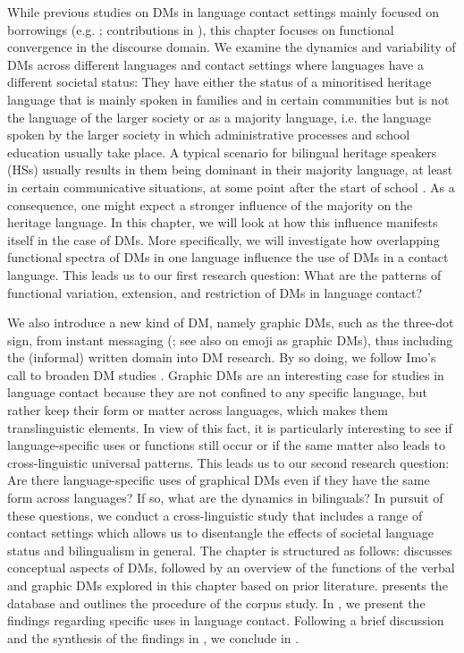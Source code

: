 \documentclass[output=paper,colorlinks,citecolor=brown]{langscibook}
\begin{document}
\noindent While previous studies on DMs in language contact settings mainly focused on borrowings (e.g. \citealt{salmons_bilingual_1990}; contributions in \citealt{maschler_discourse_2000}), this chapter focuses on functional convergence in the discourse domain. We examine the dynamics and variability of DMs across different languages and contact settings where languages have a different societal status: They have either the status of a minoritised heritage language that is mainly spoken in families and in certain communities but is not the language of the larger society or as a majority language, i.e. the language spoken by the larger society in which administrative processes and school education usually take place. A typical scenario for bilingual heritage speakers (HSs) usually results in them being dominant in their majority language, at least in certain communicative situations, at some point after the start of school \citep[cf.][]{rothman_understanding_2009, flores_different_2019}. As a consequence, one might expect a stronger influence of the majority on the heritage language. In this chapter, we will look at how this influence manifests itself in the case of DMs. More specifically, we will investigate how overlapping functional spectra of DMs in one language influence the use of DMs in a contact language. This leads us to our first research question: What are the patterns of functional variation, extension, and restriction of DMs in language contact? 

We also introduce a new kind of DM, namely graphic DMs, such as the three-dot sign, from instant messaging (\citealt{labrenz_three-dot_2022}; see also \citealt{wiese_emoji_2021} on emoji as graphic DMs), thus including the (informal) written domain into DM research. By so doing, we follow Imo's call to broaden DM studies \citep{bluhdorn_diskursmarker_2017-1}. Graphic DMs are an interesting case for studies in language contact because they are not confined to any specific language, but rather keep their form or matter across languages, which makes them translinguistic elements. In view of this fact, it is particularly interesting to see if language-specific uses or functions still occur or if the same matter also leads to cross-linguistic universal patterns. This leads us to our second research question: Are there language-specific uses of graphical DMs even if they have the same form across languages? If so, what are the dynamics in bilinguals?
In pursuit of these questions, we conduct a cross-linguistic study that includes a range of contact settings which allows us to disentangle the effects of societal language status and bilingualism in general.
The chapter is structured as follows:  discusses conceptual aspects of DMs, followed by an overview of the functions of the verbal and graphic DMs explored in this chapter based on prior literature.  presents the database and outlines the procedure of the corpus study. In , we present the findings regarding specific uses in language contact. Following a brief discussion and the synthesis of the findings in , we conclude in .
\end{document}
